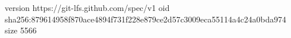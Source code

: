 version https://git-lfs.github.com/spec/v1
oid sha256:879614958f870ace4894f731f228e879ce2d57c3009eca55114a4c24a0bda974
size 5566
